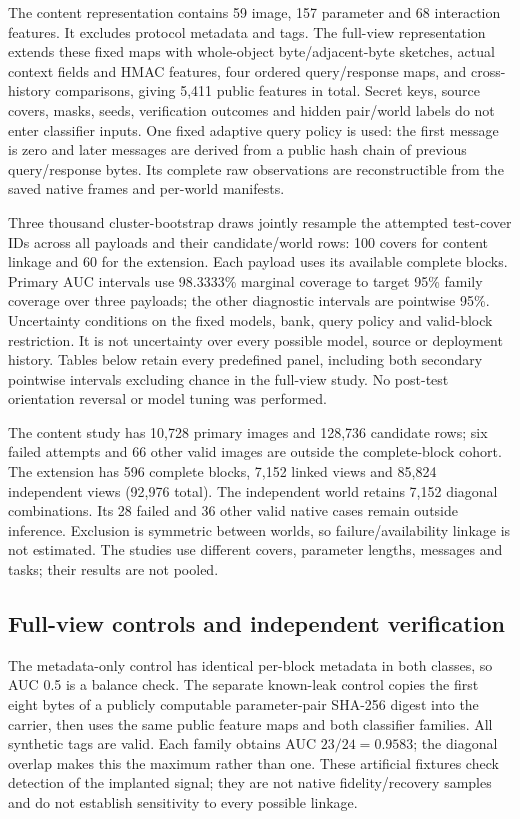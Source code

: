 \documentclass[journal]{IEEEtran}
\theoremstyle{definition}
\theoremstyle{game}
\begin{document}
The content representation contains 59 image, 157 parameter and 68
interaction features. It excludes protocol metadata and tags. The
full-view representation extends these fixed maps with whole-object
byte/adjacent-byte sketches, actual context fields and HMAC features,
four ordered query/response maps, and cross-history comparisons,
giving 5,411 public features in total. Secret keys, source covers,
masks, seeds, verification outcomes and hidden pair/world labels do
not enter classifier inputs. One fixed adaptive query policy is used:
the first message is zero and later messages are derived from a public
hash chain of previous query/response bytes. Its complete raw
observations are reconstructible from the saved native frames and
per-world manifests.

Three thousand cluster-bootstrap draws jointly resample the attempted
test-cover IDs across all payloads and their candidate/world rows:
100 covers for content linkage and 60 for the extension. Each payload
uses its available complete blocks. Primary AUC intervals use
98.3333\% marginal coverage to target 95\% family coverage over three
payloads; the other diagnostic intervals are pointwise 95\%.
Uncertainty conditions on the fixed models, bank, query policy and
valid-block restriction. It is not uncertainty over every possible
model, source or deployment history. Tables below retain every
predefined panel, including both secondary pointwise intervals excluding
chance in the full-view study. No post-test orientation reversal or
model tuning was performed.

The content study has 10,728 primary images and 128,736 candidate rows;
six failed attempts and 66 other valid images are outside the
complete-block cohort. The extension has 596 complete blocks,
7,152 linked views and 85,824 independent views (92,976 total).
The independent world retains 7,152 diagonal combinations. Its 28
failed and 36 other valid native cases remain outside inference.
Exclusion is symmetric between worlds, so failure/availability linkage
is not estimated. The studies use different covers, parameter lengths,
messages and tasks; their results are not pooled.

\subsection{Full-view controls and independent verification}
The metadata-only control has identical per-block metadata in both
classes, so AUC 0.5 is a balance check. The separate known-leak control
copies the first eight bytes of a publicly computable parameter-pair
SHA-256 digest into the carrier, then uses the same public feature maps
and both classifier families. All synthetic tags are valid. Each
family obtains AUC $23/24=0.9583$; the diagonal overlap makes this the
maximum rather than one. These artificial fixtures check detection of
the implanted signal; they are not native fidelity/recovery samples
and do not establish sensitivity to every possible linkage.
\end{document}
